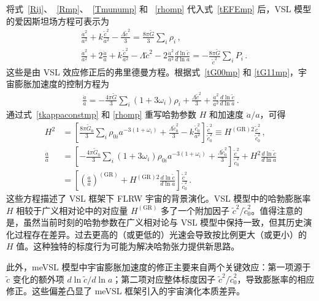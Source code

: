\documentclass[jkps,preprint,fleqn]{revtex4}
\newcommand{\tc}{\tilde{c}}
\newcommand{\tG}{\tilde{G}}
\newcommand{\GR}{\text{GR}}
\begin{document}
\begin{CJK*}{UTF8}{gbsn}
将式~\eqref{Rij}、~\eqref{Rmp}、~\eqref{Tmunump} 和 ~\eqref{rhomp} 代入式~\eqref{tEFEmp} 后，VSL 模型的爱因斯坦场方程可表示为
\begin{align}
 &\frac{\dot{a}^2}{a^2} + k \frac{\tc^2}{a^2}  -\frac{ \Lambda \tc^2}{3} = \frac{8 \pi \tG}{3} \sum_i \rho_i \label{tG00mp} \,, \\
 &\frac{\dot{a}^2}{a^2} + 2 \frac{\ddot{a}}{a} +  k \frac{\tc^2}{a^2} - \Lambda \tc^2 - 2 \frac{\dot{a}^2}{a^2} \frac{d \ln \tc}{d \ln a} = -\frac{8 \pi \tG}{\tc^2} \sum_{i} P_i  \label{tG11mp} \,.
 \end{align}
这些是由 VSL 效应修正后的弗里德曼方程。根据式~\eqref{tG00mp} 和 \eqref{tG11mp}，宇宙膨胀加速度的控制方程为
\begin{align}
 \frac{\ddot{a}}{a} = -\frac{4\pi \tG}{3} \sum_i \left( 1 + 3 \omega_i \right) \rho_i  + \frac{\Lambda \tc^2}{3} + \frac{\dot{a}^2}{a^2} \frac{d \ln \tc}{d \ln a} \label{t3G11mG00mp} \,.
 \end{align}
通过式~\eqref{tkappaconstmp} 和 \eqref{rhomp} 重写哈勃参数 $H$ 和加速度 $\ddot{a}/a$，可得
\begin{align}
 H^2 &= \left[ \frac{8 \pi \tG_0}{3} \sum_{i} \rho_{0i} a^{-3(1+\omega_i)} + \frac{ \Lambda \tc_0^2}{3} - k \frac{\tc_0^2}{a^2} \right] \frac{\tc^2}{\tc_0^2} \equiv H^{(\GR)2} \frac{\tc^2}{\tc_0^2} \label{H2me} \,, \\
 \frac{\ddot{a}}{a} &= \left[ -\frac{4\pi \tG_0}{3} \sum_i \left( 1 + 3 \omega_i \right) \rho_{0i} a^{-3(1+\omega_i)} + \frac{\Lambda \tc_0^2}{3} \right] \frac{\tc^2}{\tc_0^2} + H^2 \frac{d \ln \tc}{d \ln a} \nonumber \\
 &= \left[ \left( \frac{\ddot{a}}{a} \right)^{(\GR)} +  H^{(\GR)2} \frac{d \ln \tc}{d \ln a}  \right] \frac{\tc^2}{\tc_0^2} \label{ddotaoa} \,.
 \end{align}
这些方程描述了 VSL 框架下 FLRW 宇宙的背景演化。VSL 模型中的哈勃膨胀率 $H$ 相较于广义相对论中的对应量 $H^{(\GR)}$ 多了一个附加因子 $\tc^2/\tc_0^2$。值得注意的是，虽然当前时刻的哈勃参数在广义相对论与 VSL 模型中保持一致，但其历史演化过程存在差异。过去更高的（或更低的）光速会导致按比例更大（或更小）的 $H$ 值。这种独特的标度行为可能为解决哈勃张力提供新思路。

此外，meVSL 模型中宇宙膨胀加速度的修正主要来自两个关键效应：第一项源于 $\tc$ 变化的额外项 $d \ln \tc/d \ln a$；第二项对应整体标度因子 $\tc^2/\tc_0^2$，导致膨胀率的相应修正。这些偏差凸显了 meVSL 框架引入的宇宙演化本质差异。


\end{CJK*}
\end{document}
